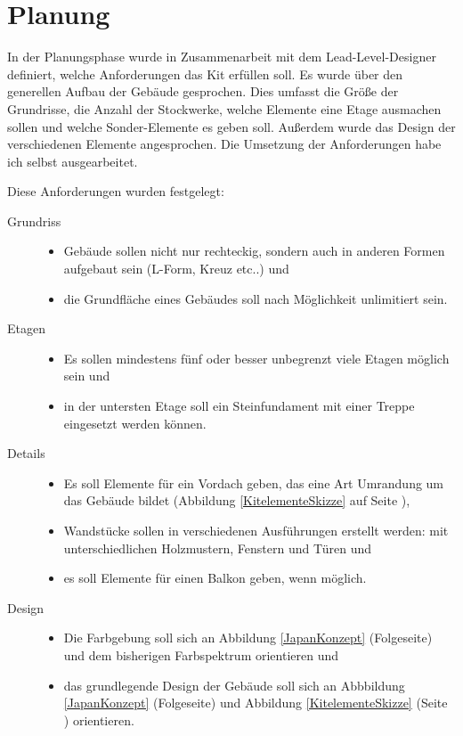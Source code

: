 \vspace{-10.5pt}
\newpage
\section{Planung}
In der Planungsphase wurde in Zusammenarbeit mit dem Lead-Level-Designer definiert, welche Anforderungen das Kit erfüllen soll. Es wurde über den generellen Aufbau der Gebäude gesprochen. Dies umfasst die Größe der Grundrisse, die Anzahl der Stockwerke, welche Elemente eine Etage ausmachen sollen und welche Sonder-Elemente es geben soll. Außerdem wurde das Design der verschiedenen Elemente angesprochen. Die Umsetzung der Anforderungen habe ich selbst ausgearbeitet.
\par
Diese Anforderungen wurden festgelegt:
\begin{description}
\item[Grundriss]\hfill
\begin{itemize}[leftmargin=0cm]
\item Gebäude sollen nicht nur rechteckig, sondern auch in anderen Formen aufgebaut sein (L-Form, Kreuz etc..) und
\item die Grundfläche eines Gebäudes soll nach Möglichkeit unlimitiert sein.
\end{itemize}
\item[Etagen]\hfill
\begin{itemize}[leftmargin=-0cm]
\item Es sollen mindestens fünf oder besser unbegrenzt viele Etagen möglich sein und
\item in der untersten Etage soll ein Steinfundament mit einer Treppe eingesetzt werden können.
\end{itemize}
\item[Details]\hfill
\begin{itemize}[leftmargin=-0cm]
\item Es soll Elemente für ein Vordach geben, das eine Art Umrandung um das Gebäude bildet (Abbildung \ref{KitelementeSkizze} auf Seite \pageref{KitelementeSkizze} ),
\item Wandstücke sollen in verschiedenen Ausführungen erstellt werden: mit unterschiedlichen Holzmustern, Fenstern und Türen und
\item es soll Elemente für einen Balkon geben, wenn möglich.
\end{itemize}
\item[Design]\hfill
\begin{itemize}[leftmargin=-0cm]
\item Die Farbgebung soll sich an Abbildung \ref{JapanKonzept} (Folgeseite) und dem bisherigen Farbspektrum orientieren und
\item das grundlegende Design der Gebäude soll sich an Abbbildung \ref{JapanKonzept} (Folgeseite) und Abbildung \ref{KitelementeSkizze} (Seite \pageref{KitelementeSkizze}) orientieren.
\end{itemize}
\end{description}
